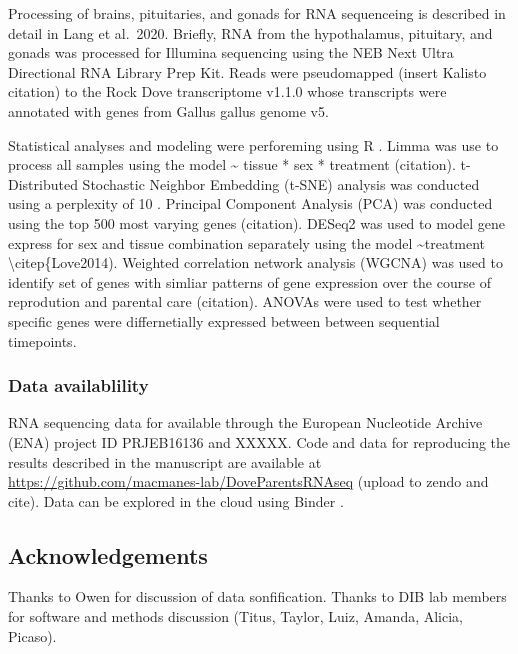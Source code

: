 Processing of brains, pituitaries, and gonads for RNA sequenceing is
described in detail in Lang et al.~2020. Briefly, RNA from the
hypothalamus, pituitary, and gonads was processed for Illumina
sequencing using the NEB Next Ultra Directional RNA Library Prep Kit.
Reads were pseudomapped (insert Kalisto citation) to the Rock Dove
transcriptome v1.1.0 whose transcripts were annotated with genes from
Gallus gallus genome v5.

Statistical analyses and modeling were perforeming using R
\citep{RDevelopmentCoreTeam2013, Wickham2016}. Limma was use to process
all samples using the model \textasciitilde{} tissue * sex * treatment
(citation). t-Distributed Stochastic Neighbor Embedding (t-SNE) analysis
was conducted using a perplexity of 10 \citep{VanDerMaaten2008}.
Principal Component Analysis (PCA) was conducted using the top 500 most
varying genes (citation). DESeq2 was used to model gene express for sex
and tissue combination separately using the model
\textasciitilde{}treatment \textbackslash{}citep\{Love2014). Weighted
correlation network analysis (WGCNA) was used to identify set of genes
with simliar patterns of gene expression over the course of reprodution
and parental care (citation). ANOVAs were used to test whether specific
genes were differnetially expressed between between sequential
timepoints.

\hypertarget{data-availablility}{%
\subsubsection{Data availablility}\label{data-availablility}}

RNA sequencing data for available through the European Nucleotide
Archive (ENA) project ID PRJEB16136 and XXXXX. Code and data for
reproducing the results described in the manuscript are available at
\url{https://github.com/macmanes-lab/DoveParentsRNAseq} (upload to zendo
and cite). Data can be explored in the cloud using Binder
\citep{project_jupyter-proc-scipy-2018}.

\hypertarget{acknowledgements}{%
\subsection{Acknowledgements}\label{acknowledgements}}

Thanks to Owen for discussion of data sonfification. Thanks to DIB lab
members for software and methods discussion (Titus, Taylor, Luiz,
Amanda, Alicia, Picaso).

